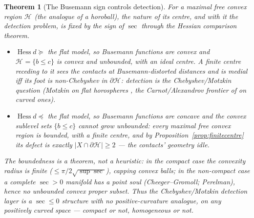 \documentclass[11pt]{article}
\newtheorem{theorem}{Theorem}[section]
\theoremstyle{remark}
\newcommand{\X}{X}
\newcommand{\Hb}[1]{\mathcal{H}_{#1}}
\begin{document}
\begin{theorem}[The Busemann sign controls detection]\label{thm:busemannsign}
For a maximal free convex region $\Hb{}$ (the analogue of a horoball), the
nature of its centre, and with it the detection problem, is fixed by the
sign of $\sec$ through the Hessian comparison theorem.
\begin{itemize}
\item[$\sec\le0$:] $\operatorname{Hess}d\succeq$ the flat model, so Busemann
functions are convex and $\Hb{}=\{b\le c\}$ is convex and \emph{unbounded},
with an \emph{ideal} centre. A finite centre receding to it sees the
contacts at Busemann-distorted distances and is medial iff its foot is
non-Chebyshev in $\partial\Hb{}$: detection is the Chebyshev/Motzkin
question (Motzkin on flat horospheres \cite{Bia}, the Carnot/Alexandrov
frontier of \cite{R3} on curved ones).
\item[$\sec\ge0$:] $\operatorname{Hess}d\preceq$ the flat model, so Busemann
functions are concave and the convex sublevel sets $\{b\le c\}$ cannot grow
unbounded: every maximal free convex region is \emph{bounded}, with a
\emph{finite} centre, and by Proposition~\ref{prop:finitecentre} its defect
is exactly $|\X\cap\partial\Hb{}|\ge2$ --- the contacts' geometry idle.
\end{itemize}
The boundedness is a theorem, not a heuristic: in the compact case the
convexity radius is finite ($\le\pi/2\sqrt{\sup\sec}$), capping convex
balls; in the non-compact case a complete $\sec>0$ manifold has a
\emph{point} soul (Cheeger--Gromoll; Perelman), hence no unbounded convex
proper subset. Thus the Chebyshev/Motzkin detection layer is a $\sec\le0$
structure with no positive-curvature analogue, on any positively curved
space --- compact or not, homogeneous or not.
\end{theorem}
\end{document}
